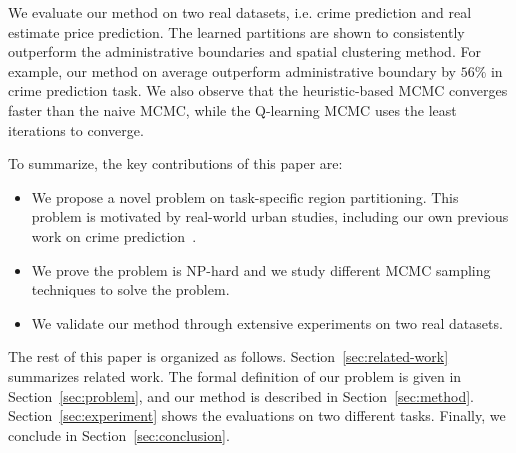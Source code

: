 We evaluate our method on two real datasets, i.e. crime prediction and real estimate price prediction. The learned partitions are shown to consistently outperform the administrative boundaries and spatial clustering method. For example, our method on average outperform administrative boundary by $56\%$ in crime prediction task. We also observe that the heuristic-based MCMC converges faster than the naive MCMC, while the Q-learning MCMC uses the least iterations to converge.

To summarize, the key contributions of this paper are:
\begin{itemize}[leftmargin=*]
\item We propose a novel problem on task-specific region partitioning. This problem is motivated by real-world urban studies, including our own previous work on crime prediction~\cite{wang2016crime}.
\item We prove the problem is NP-hard and we study different MCMC sampling techniques to solve the problem. 
\item We validate our method through extensive experiments on two real datasets.
\end{itemize}


The rest of this paper is organized as follows. Section~\ref{sec:related-work} summarizes related work. The formal definition of our problem is given in Section~\ref{sec:problem}, and our method is described in Section~\ref{sec:method}. Section~\ref{sec:experiment} shows the evaluations on two different tasks. Finally, we conclude in Section~\ref{sec:conclusion}.

